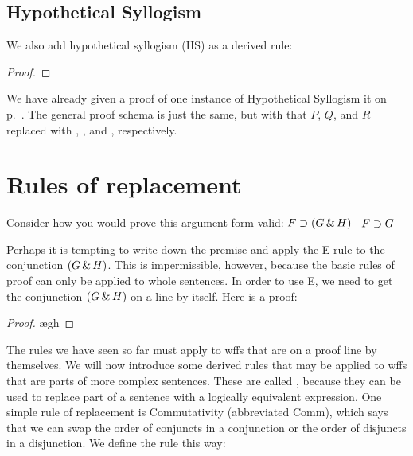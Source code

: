 \subsection{Hypothetical Syllogism}



We also add hypothetical syllogism (HS) as a derived rule:

\begin{proof}
\end{proof}

We have already given a proof of one instance of Hypothetical Syllogism it on p.~\pageref{HSproof}. The general proof schema is just the same, but with that $P$, $Q$, and $R$ replaced with \metaA{}, \metaB{}, and \metaC{}, respectively.





\section{Rules of replacement}

Consider how you would prove this argument form valid: $F\supset(G\,\&\, H)$ \therefore\ $F\supset G$

Perhaps it is tempting to write down the premise and apply the {\eand}E rule to the conjunction $(G \,\&\, H)$. This is impermissible, however, because the basic rules of proof can only be applied to whole sentences. In order to use {\eand}E, we need to get the conjunction $(G \,\&\, H)$ on a line by itself. Here is a proof:

\begin{proof}
	\open
		\ae{gh}
	\close
\end{proof}

The rules we have seen so far must apply to wffs that are on a proof line by themselves. We will now introduce some derived rules that may be applied to wffs that are parts of more complex sentences. These are called , because they can be used to replace part of a sentence with a logically equivalent expression. One simple rule of replacement is Commutativity (abbreviated Comm), which says that we can swap the order of conjuncts in a conjunction or the order of disjuncts in a disjunction. We define the rule this way:

